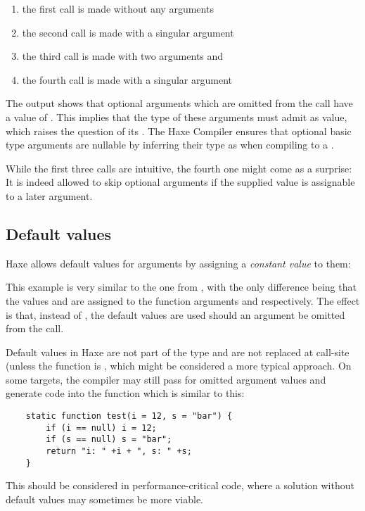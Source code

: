 \begin{enumerate}
	\item the first call is made without any arguments
	\item the second call is made with a singular argument 
	\item the third call is made with two arguments  and 
	\item the fourth call is made with a singular argument 
\end{enumerate}
The output shows that optional arguments which are omitted from the call have a value of . This implies that the type of these arguments must admit  as value, which raises the question of its . The Haxe Compiler ensures that optional basic type arguments are nullable by inferring their type as  when compiling to a .

While the first three calls are intuitive, the fourth one might come as a surprise: It is indeed allowed to skip optional arguments if the supplied value is assignable to a later argument.


\subsection{Default values}
\label{types-function-default-values}

Haxe allows default values for arguments by assigning a \emph{constant value} to them:

This example is very similar to the one from , with the only difference being that the values  and  are assigned to the function arguments  and  respectively. The effect is that, instead of , the default values are used should an argument be omitted from the call.


Default values in Haxe are not part of the type and are not replaced at call-site (unless the function is , which might be considered a more typical approach. On some targets, the compiler may still pass  for omitted argument values and generate code into the function which is similar to this:
\begin{lstlisting}
	static function test(i = 12, s = "bar") {
		if (i == null) i = 12;
		if (s == null) s = "bar";
		return "i: " +i + ", s: " +s;
	}
\end{lstlisting}
This should be considered in performance-critical code, where a solution without default values may sometimes be more viable.





